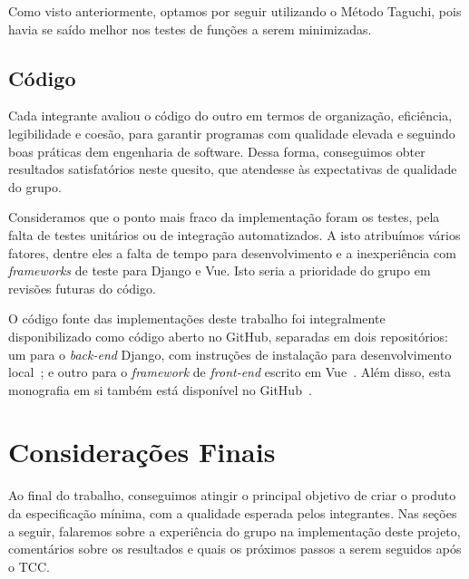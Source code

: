 \documentclass[]{politex}
\begin{document}
Como visto anteriormente, optamos por seguir utilizando o Método Taguchi, pois
havia se saído melhor nos testes de funções a serem minimizadas.



\section{Código}

Cada integrante avaliou o código do outro em termos de organização, eficiência,
legibilidade e coesão, para garantir programas com qualidade elevada e seguindo
boas práticas dem engenharia de software. Dessa forma, conseguimos obter
resultados satisfatórios neste quesito, que atendesse às expectativas de
qualidade do grupo.

Consideramos que o ponto mais fraco da implementação foram os testes, pela falta
de testes unitários ou de integração automatizados. A isto atribuímos vários
fatores, dentre eles a falta de tempo para desenvolvimento e a inexperiência com
\textit{frameworks} de teste para Django e Vue. Isto seria a prioridade do grupo
em revisões futuras do código.

O código fonte das implementações deste trabalho foi integralmente
disponibilizado como código aberto no GitHub, separadas em dois repositórios: um
para o \textit{back-end} Django, com instruções de instalação para
desenvolvimento local~\cite{repo-django}; e outro para o \textit{framework} de
\textit{front-end} escrito em Vue~\cite{repo-vue}. Além disso, esta monografia
em si também está disponível no GitHub~\cite{repo-tcc}.

\chapter{Considerações Finais}

Ao final do trabalho, conseguimos atingir o principal objetivo de criar o
produto da especificação mínima, com a qualidade esperada pelos integrantes. Nas
seções a seguir, falaremos sobre a experiência do grupo na implementação deste
projeto, comentários sobre os resultados e quais os próximos passos a serem
seguidos após o TCC.
\end{document}
